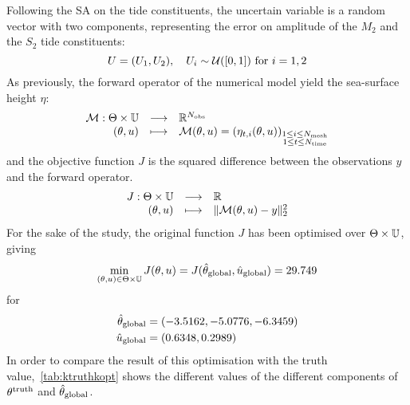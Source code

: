 \documentclass[../../Main_ManuscritThese.tex]{subfiles}
\begin{document}
Following the SA on the tide constituents, the uncertain variable is a
random vector with two components, representing the error on
amplitude of the $M_2$ and the $S_2$ tide constituents:
\begin{equation}
  \UU = (\UU_1,\UU_2), \quad \UU_i \sim \mathcal{U}(\interval{0}{1}) \text{ for } i=1,2
\end{equation}
As previously, the forward operator of the numerical model yield the
sea-surface height $\eta$:
\begin{equation}
  \begin{array}{rcl}
    \mathcal{M}: \Kspace \times \Uspace &\longrightarrow& \mathbb{R}^{N_{\mathrm{obs}}} \\
    (\kk, \uu)& \longmapsto & \mathcal{M}(\kk, \uu) = \left(\eta_{t,i}(\kk, \uu)\right)_{\substack{1 \leq i \leq N_{\mathrm{mesh}} \\ 1 \leq t \leq N_{\mathrm{time}}}} \\ 
  \end{array}
\end{equation}
and the objective function $J$ is the squared difference between the
observations $y$ and the forward operator.
\begin{equation}
  \begin{array}{rcl}
    J: \Kspace \times \Uspace & \longrightarrow & \mathbb{R} \\
    (\kk, \uu) & \longmapsto & \|\mathcal{M}(\kk, \uu) - y \|^2_2
  \end{array}
\end{equation}
For the sake of the study, the original function $J$ has been
optimised over $\Kspace\times\Uspace$, giving
\begin{equation}
  \min_{(\kk,\uu) \in \Kspace \times \Uspace} J(\kk, \uu) = J(\hat{\kk}_{\mathrm{global}}, \hat{\uu}_{\mathrm{global}})= \num{29.749}
\end{equation}
for
\begin{align}
  \hat{\kk}_{\mathrm{global}}                     & = (\num[round-mode=places,round-precision=4]{-3.5161661} , \num[round-mode=places,round-precision=4]{-5.07764701}, \num[round-mode=places,round-precision=4]{-6.34588442})                                                                                                            \\\hat{\uu}_{\mathrm{global}} & = (\num[round-mode=places,round-precision=4]{0.6347829},\num[round-mode=places,round-precision=4]{0.29890637})
\end{align}
In order to compare the result of this optimisation with the truth
value,~\cref{tab:ktruthkopt} shows the different values of the
different components of $\kk^{\mathrm{truth}}$ and
$\hat{\kk}_{\mathrm{global}}$.
\end{document}
